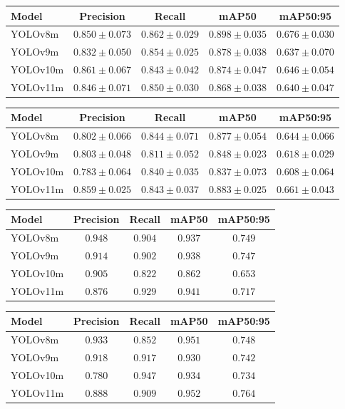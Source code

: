 \begin{tabular}{lcccc}
\toprule
Model & Precision & Recall & mAP50 & mAP50:95 \\
\midrule
YOLOv8m & $0.850 \pm 0.073$ & $0.862 \pm 0.029$ & $0.898 \pm 0.035$ & $0.676 \pm 0.030$ \\
YOLOv9m & $0.832 \pm 0.050$ & $0.854 \pm 0.025$ & $0.878 \pm 0.038$ & $0.637 \pm 0.070$ \\
YOLOv10m & $0.861 \pm 0.067$ & $0.843 \pm 0.042$ & $0.874 \pm 0.047$ & $0.646 \pm 0.054$ \\
YOLOv11m & $0.846 \pm 0.071$ & $0.850 \pm 0.030$ & $0.868 \pm 0.038$ & $0.640 \pm 0.047$ \\
\bottomrule
\end{tabular}

\begin{tabular}{lcccc}
\toprule
Model & Precision & Recall & mAP50 & mAP50:95 \\
\midrule
YOLOv8m & $0.802 \pm 0.066$ & $0.844 \pm 0.071$ & $0.877 \pm 0.054$ & $0.644 \pm 0.066$ \\
YOLOv9m & $0.803 \pm 0.048$ & $0.811 \pm 0.052$ & $0.848 \pm 0.023$ & $0.618 \pm 0.029$ \\
YOLOv10m & $0.783 \pm 0.064$ & $0.840 \pm 0.035$ & $0.837 \pm 0.073$ & $0.608 \pm 0.064$ \\
YOLOv11m & $0.859 \pm 0.025$ & $0.843 \pm 0.037$ & $0.883 \pm 0.025$ & $0.661 \pm 0.043$ \\
\bottomrule
\end{tabular}

\begin{tabular}{lcccc}
\toprule
Model & Precision & Recall & mAP50 & mAP50:95 \\
\midrule
YOLOv8m & $0.948$ & $0.904$ & $0.937$ & $0.749$ \\
YOLOv9m & $0.914$ & $0.902$ & $0.938$ & $0.747$ \\
YOLOv10m & $0.905$ & $0.822$ & $0.862$ & $0.653$ \\
YOLOv11m & $0.876$ & $0.929$ & $0.941$ & $0.717$ \\
\bottomrule
\end{tabular}

\begin{tabular}{lcccc}
\toprule
Model & Precision & Recall & mAP50 & mAP50:95 \\
\midrule
YOLOv8m & $0.933$ & $0.852$ & $0.951$ & $0.748$ \\
YOLOv9m & $0.918$ & $0.917$ & $0.930$ & $0.742$ \\
YOLOv10m & $0.780$ & $0.947$ & $0.934$ & $0.734$ \\
YOLOv11m & $0.888$ & $0.909$ & $0.952$ & $0.764$ \\
\bottomrule
\end{tabular}

